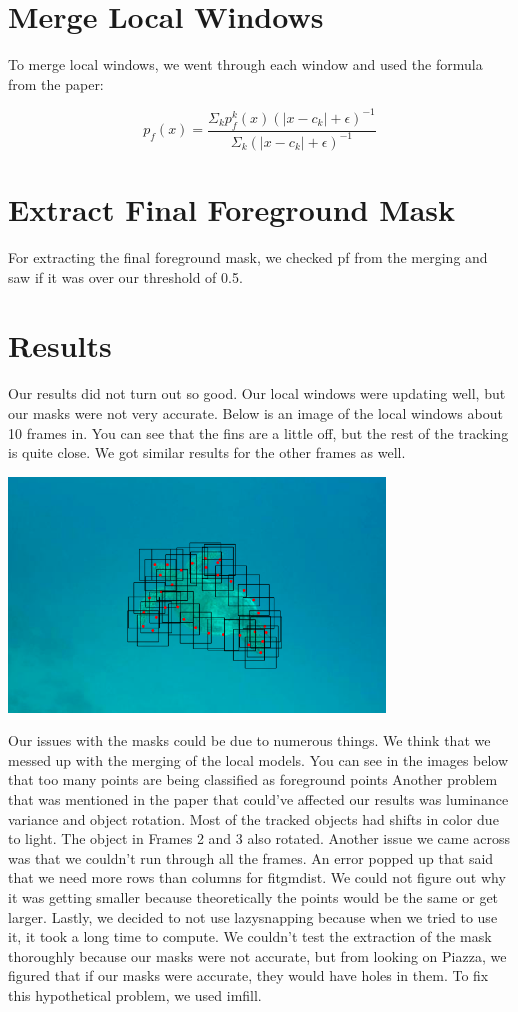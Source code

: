 \documentclass{article}
\begin{document}
	\section{Merge Local Windows}
	
	To merge local windows, we went through each window and used the formula from the paper:
	
	$$p_f(x)=\frac{\Sigma_kp_f^k(x)(|x-c_k|+\epsilon)^{-1}}{\Sigma_k(|x-c_k|+\epsilon)^{-1}}$$
	
	\section{Extract Final Foreground Mask}
	For extracting the final foreground mask, we checked pf from the merging and saw if it was over our threshold of 0.5. 
	
	\section{Results}
	Our results did not turn out so good. Our local windows were updating well, but our masks were not very accurate. Below is an image of the local windows about 10 frames in. You can see that the fins are a little off, but the rest of the tracking is quite close. We got similar results for the other frames as well.
	
	\begin{center}
		\includegraphics[width=100mm]{img/i11}
	\end{center}

	Our issues with the masks could be due to numerous things. We think that we messed up with the merging of the local models. You can see in the images below that too many points are being classified as foreground points
	Another problem that was mentioned in the paper that could’ve affected our results was luminance variance and object rotation. Most of the tracked objects had shifts in color due to light. The object in Frames 2 and 3 also rotated.
	Another issue we came across was that we couldn’t run through all the frames. An error popped up that said that we need more rows than columns for fitgmdist. We could not figure out why it was getting smaller because theoretically the points would be the same or get larger.
	Lastly, we decided to not use lazysnapping because when we tried to use it, it took a long time to compute. We couldn’t test the extraction of the mask thoroughly because our masks were not accurate, but from looking on Piazza, we figured that if our masks were accurate, they would have holes in them. To fix this hypothetical problem, we used imfill. 
	
\end{document}
